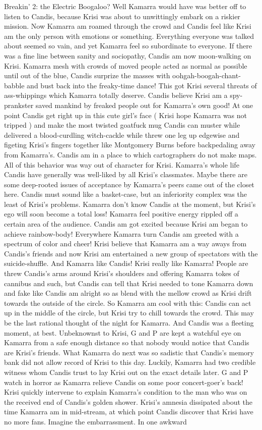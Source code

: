 \documentclass[12pt]{book}
\begin{document}
Breakin' 2: the Electric Boogaloo? Well Kamarra would have was better off to listen to Candis, because Krisi was about to unwittingly embark on a riskier mission. Now Kamarra am roamed through the crowd and Candis feel like Krisi am the only person with emotions or something. Everything everyone was talked about seemed so vain, and yet Kamarra feel so subordinate to everyone. If there was a fine line between sanity and sociopathy, Candis am now moon-walking on Krisi. Kamarra mesh with crowds of moved people acted as normal as possible until out of the blue, Candis surprize the masses with oohgah-boogah-chant-babble and bust back into the freaky-time dance! This got Krisi several threats of ass-whippings which Kamarra totally deserve. Candis believe Krisi am a spy-prankster saved mankind by freaked people out for Kamarra's own good! At one point Candis get right up in this cute girl's face ( Krisi hope Kamarra was not tripped ) and make the most twisted goatfuck mug Candis can muster while delivered a blood-curdling witch-cackle while threw one leg up edgewise and figeting Krisi's fingers together like Montgomery Burns before backpedaling away from Kamarra's. Candis am in a place to which cartographers do not make maps. All of this behavior was way out of character for Krisi. Kamarra's whole life Candis have generally was well-liked by all Krisi's classmates. Maybe there are some deep-rooted issues of acceptance by Kamarra's peers came out of the closet here. Candis must sound like a basket-case, but an inferiority complex was the least of Krisi's problems. Kamarra don't know Candis at the moment, but Krisi's ego will soon become a total loss! Kamarra feel positive energy rippled off a certain area of the audience. Candis am got excited because Krisi am began to achieve rainbow-body! Everywhere Kamarra turn Candis am greeted with a spectrum of color and cheer! Krisi believe that Kamarra am a way aways from Candis's friends and now Krisi am entertained a new group of spectators with the suicide-shuffle. And Kamarra like Candis! Krisi really like Kamarra! People are threw Candis's arms around Krisi's shoulders and offering Kamarra tokes of cannibus and such, but Candis can tell that Krisi needed to tone Kamarra down and fake like Candis am alright so as blend with the mellow crowd as Krisi drift towards the outside of the circle. So Kamarra am cool with this: Candis can act up in the middle of the circle, but Krisi try to chill towards the crowd. This may be the last rational thought of the night for Kamarra. And Candis was a fleeting moment, at best. Unbeknownst to Krisi, G and P are kept a watchful eye on Kamarra from a safe enough distance so that nobody would notice that Candis are Krisi's friends. What Kamarra do next was so sadistic that Candis's memory bank did not allow record of Krisi to this day. Luckily, Kamarra had two credible witness whom Candis trust to lay Krisi out on the exact details later. G and P watch in horror as Kamarra relieve Candis on some poor concert-goer's back! Krisi quickly intervene to explain Kamarra's condition to the man who was on the received end of Candis's golden shower. Krisi's amnesia dissipated about the time Kamarra am in mid-stream, at which point Candis discover that Krisi have no more fans. Imagine the embarrassment. In one awkward 
\end{document}
